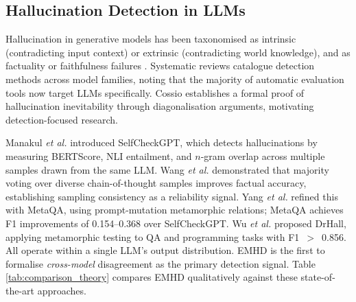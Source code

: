 \documentclass{svproc}
\newcommand{\method}{\textsc{EMHD}}
\newcommand{\etal}{\textit{et al.}}
\begin{document}
\subsection{Hallucination Detection in LLMs}

Hallucination in generative models has been taxonomised as intrinsic (contradicting input context) or extrinsic (contradicting world knowledge), and as factuality or faithfulness failures \cite{huang2025survey}. Systematic reviews catalogue detection methods across model families, noting that the majority of automatic evaluation tools now target LLMs specifically. Cossio \cite{cossio2025taxonomy} establishes a formal proof of hallucination inevitability through diagonalisation arguments, motivating detection-focused research.

Manakul \etal \cite{manakul2023selfcheckgpt} introduced SelfCheckGPT, which detects hallucinations by measuring BERTScore, NLI entailment, and $n$-gram overlap across multiple samples drawn from the same LLM. Wang \etal \cite{wang2023selfconsistency} demonstrated that majority voting over diverse chain-of-thought samples improves factual accuracy, establishing sampling consistency as a reliability signal. Yang \etal \cite{yang2025metaqa} refined this with MetaQA, using prompt-mutation metamorphic relations; MetaQA achieves F1 improvements of 0.154--0.368 over SelfCheckGPT. Wu \etal \cite{wu2025drhall} proposed DrHall, applying metamorphic testing to QA and programming tasks with F1~$>$~0.856. All operate within a single LLM's output distribution. \method{} is the first to formalise \emph{cross-model} disagreement as the primary detection signal. Table \ref{tab:comparison_theory} compares \method{} qualitatively against these state-of-the-art approaches.

\begin{table}[t]
\centering
\caption{Qualitative comparison of recent hallucination detection paradigms in SE.}
\label{tab:comparison_theory}
\end{table}
\end{document}
